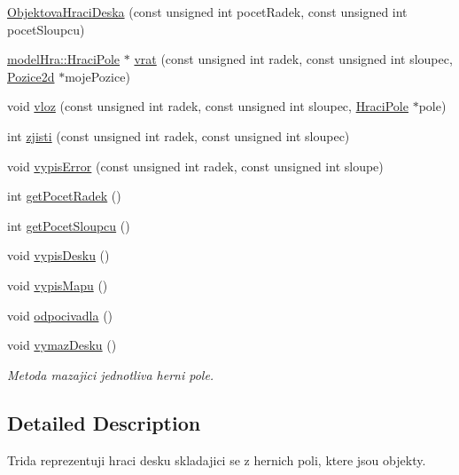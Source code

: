 \begin{DoxyCompactItemize}
\item 
\hyperlink{classmodel_hra_1_1_objektova_hraci_deska_a8809779cc7206f9fff039f799b6a8e8e}{Objektova\-Hraci\-Deska} (const unsigned int pocet\-Radek, const unsigned int pocet\-Sloupcu)
\item 
\hyperlink{classmodel_hra_1_1_hraci_pole}{model\-Hra\-::\-Hraci\-Pole} $\ast$ \hyperlink{classmodel_hra_1_1_objektova_hraci_deska_a73fc0583e42148884f1ac6ce62fca35e}{vrat} (const unsigned int radek, const unsigned int sloupec, \hyperlink{struct_pozice2d}{Pozice2d} $\ast$moje\-Pozice)
\item 
void \hyperlink{classmodel_hra_1_1_objektova_hraci_deska_aebb886d503c425943ba4820cfa1ea1d4}{vloz} (const unsigned int radek, const unsigned int sloupec, \hyperlink{classmodel_hra_1_1_hraci_pole}{Hraci\-Pole} $\ast$pole)
\item 
int \hyperlink{classmodel_hra_1_1_objektova_hraci_deska_af993f2e238b1e3c7eb01bc985443c6b1}{zjisti} (const unsigned int radek, const unsigned int sloupec)
\item 
void \hyperlink{classmodel_hra_1_1_objektova_hraci_deska_ad31f1711192fabc3a025c9e9c6a617cc}{vypis\-Error} (const unsigned int radek, const unsigned int sloupe)
\item 
int \hyperlink{classmodel_hra_1_1_objektova_hraci_deska_a3a84214311a5c0c5791d83ea19729ff5}{get\-Pocet\-Radek} ()
\item 
int \hyperlink{classmodel_hra_1_1_objektova_hraci_deska_a776f549dfa55005e8bcf8223cbce56e0}{get\-Pocet\-Sloupcu} ()
\item 
void \hyperlink{classmodel_hra_1_1_objektova_hraci_deska_afdb06e56fd0e7f8a719c915074b4747b}{vypis\-Desku} ()
\item 
void \hyperlink{classmodel_hra_1_1_objektova_hraci_deska_ac5346b96691a3bd15c84dd6c8c21ad30}{vypis\-Mapu} ()
\item 
void \hyperlink{classmodel_hra_1_1_objektova_hraci_deska_a2cffa2008e6cb42f48cd1d901ab9b2b3}{odpocivadla} ()
\item 
void \hyperlink{classmodel_hra_1_1_objektova_hraci_deska_a351fbc53fbdd6b8e8acbf57fbae0ef76}{vymaz\-Desku} ()
\begin{DoxyCompactList}\small\item\em Metoda mazajici jednotliva herni pole. \end{DoxyCompactList}\end{DoxyCompactItemize}


\subsection{Detailed Description}
Trida reprezentuji hraci desku skladajici se z hernich poli, ktere jsou objekty. 


